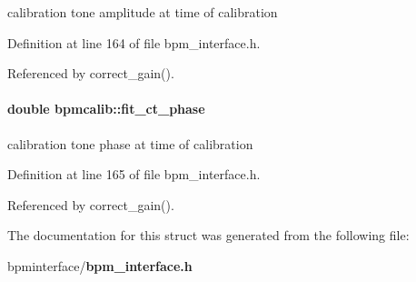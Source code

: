 calibration tone amplitude at time of calibration 

Definition at line 164 of file bpm\_\-interface.h.

Referenced by correct\_\-gain().
\paragraph[fit\_\-ct\_\-phase]{\setlength{\rightskip}{0pt plus 5cm}double {\bf bpmcalib::fit\_\-ct\_\-phase}}\hfill\label{structbpmcalib_19628aa46fdec1c05e40b73df1d6f424}


calibration tone phase at time of calibration 

Definition at line 165 of file bpm\_\-interface.h.

Referenced by correct\_\-gain().

The documentation for this struct was generated from the following file:\begin{CompactItemize}
\item 
bpminterface/{\bf bpm\_\-interface.h}\end{CompactItemize}
